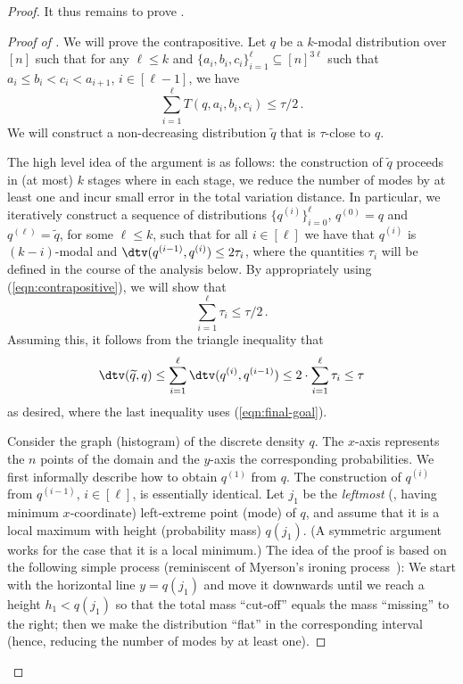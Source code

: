\begin{proof}
{{}



}

\medskip

\noindent It thus remains to prove .

\begin{proof}[Proof of ]
We will prove the contrapositive. Let $q$ be a $k$-modal distribution over $[n]$ such that
for any $\ell \le k$ and $\{a_i, b_i, c_i\}_{i=1}^{\ell} \subseteq [n]^{3\ell}$ such that $a_i \le b_i < c_i < a_{i+1}$, $i \in [\ell-1]$,
we have
\begin{equation} \label{eqn:contrapositive}
\sum_{i=1}^{\ell} T(q, a_i, b_i, c_i) \le \tau/2\,.
\end{equation}
We will construct a non-decreasing distribution $\widetilde{q}$ that is $\tau$-close to $q$. 

{The high level idea of the argument is as follows:}
the construction of $\widetilde{q}$ proceeds in {(at most)} $k$ stages
where in each stage, we reduce the number of modes by at least one and incur 
small error in the total variation distance.
In particular, we iteratively construct a sequence of distributions $\{q^{(i)} \}_{i=0}^{{\ell}}$, $q^{(0)} = q$ and $q^{({\ell})} = \widetilde{q}$,
for some ${\ell \le k}$, such that for all $i \in [{\ell}]$ we have that $q^{(i)}$ is $(k-i)$-modal and $\dtv(q^{(i-1)}, q^{(i)}) \leq {2\tau_i}$,
{where the quantities $\tau_i$ will be defined in the course
of the analysis below.}
{By appropriately using (\ref{eqn:contrapositive}), we will show that 
\begin{equation} \label{eqn:final-goal}
\sum_{i=1}^{{\ell}} \tau_i \le \tau/2\,.
\end{equation} 
Assuming this, it follows from 
the triangle inequality that
$$\dtv(\widetilde{q}, q ) \le \sum_{i=1}^{{\ell}} \dtv(q^{(i)}, q^{(i-1)}) \le 2 \cdot \sum_{i=1}^{{\ell}} \tau_i  \le \tau$$
as desired, where the last inequality uses (\ref{eqn:final-goal}).
}

\medskip

Consider the graph (histogram) of the discrete density $q$. The $x$-axis represents the $n$ points of the domain and the $y$-axis
the corresponding probabilities. We first informally describe how to obtain $q^{(1)}$ from $q$. The construction of {$q^{(i)}$ from $q^{(i-1)}$, $i \in [\ell]$,}
is {essentially} identical. Let $j_{{1}}$ be the \emph{leftmost} {(\ie, having minimum $x$-coordinate)} 
left-extreme point (mode) of $q$, and assume that it is a local maximum with height (probability mass) $q(j_{{1}})$.
(A symmetric argument works for the case that it is a local minimum.)
The idea of the proof is based on the following simple process (reminiscent of Myerson's ironing process~\cite{Myerson:81}): 
We start with the horizontal line $y = q(j_{{1}})$ and move it downwards
until we reach a height ${h_1} < q(j_{{1}})$ so that the total mass ``cut-off'' equals the mass
``missing'' to the right; then we make the distribution ``flat'' in the corresponding interval (hence, reducing the number of modes by at least one).
%
%


\end{proof}
\end{proof}
